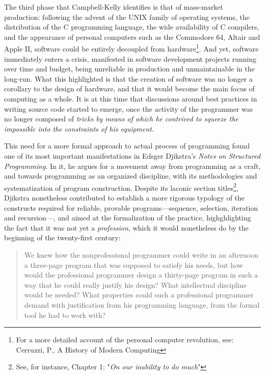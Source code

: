 The third phase that Campbell-Kelly identifies is that of mass-market production: following the advent of the UNIX family of operating systems, the distribution of the C programming language, the wide availability of C compilers, and the appearance of personal computers such as the Commodore 64, Altair and Apple II, software could be entirely decoupled from hardware\footnote{For a more detailed account of the personal computer revolution, see: Cerruzzi, P., A History of Modern Computing\cite{ceruzzi_history_2003}}. And yet, software immediately enters a crisis, manifested in software development projects running over time and budget, being unreliable in production and unmaintainable in the long-run. What this highlighted is that the creation of software was no longer a corollary to the design of hardware, and that it would become the main focus of computing as a whole\cite{ceruzzi_history_2003}. It is at this time that discussions around best practices in writing source code started to emerge, once the activity of the programmer was no longer composed of \emph{tricks by means of which he contrived to squeeze the impossible into the constraints of his equipment}\cite{dijkstra_humble_2007}.

This need for a more formal approach to actual process of programming found one of its most important manifestations in Edsger Djikstra's \emph{Notes on Structured Programming}\cite{dijkstra_chapter_1972}. In it, he argues for a movement away from programming as a craft, and towards programming as an organized discipline, with its methodologies and systematization of program construction. Despite its laconic section titles\footnote{See, for instance, Chapter 1: "\emph{On our inability to do much}"}, Djikstra nonetheless contributed to establish a more rigorous typology of the constructs required for reliable, provable programs—sequence, selection, iteration and recursion—, and aimed at the formalization of the practice, highghlighting the fact that it was not yet a \emph{profession}, which it would nonetheless do by the beginning of the twenty-first century:

\begin{quote}
    We knew how the nonprofessional programmer could write in an afternoon a three-page program that was supposed to satisfy his needs, but how would the professional programmer design a thirty-page program in such a way that he could really justify his design? What intellectual discipline would be needed? What properties could such a professional programmer demand with justification from his programming language, from the formal tool he had to work with? \cite{dijkstra_ew_programming_1977}
\end{quote}

